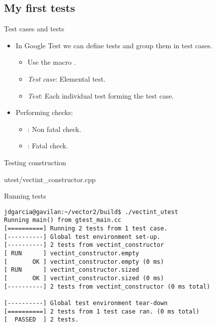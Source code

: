 \subsection{My first tests}

\begin{frame}[t]{Test cases and tests}
\begin{itemize}
  \item In Google Test we can define tests and group them in test cases.
    \begin{itemize}
      \item Use the macro .
      \item \emph{Test case}: Elemental test.
      \item \emph{Test}: Each individual test forming the test case.
    \end{itemize}

  \vfill
  \item Performing checks:
    \begin{itemize}
      \item {}: Non fatal check.
      \item {}: Fatal check.
    \end{itemize}
\end{itemize}
\end{frame}

\begin{frame}[t]{Testing construction}
\begin{block}{utest/vectint\_constructor.cpp}

\end{block}
\end{frame}

\begin{frame}[t,fragile]{Running tests}
\begin{lstlisting}[style=terminal]
jdgarcia@gavilan:~/vector2/build$ ./vectint_utest 
Running main() from gtest_main.cc
[==========] Running 2 tests from 1 test case.
[----------] Global test environment set-up.
[----------] 2 tests from vectint_constructor
[ RUN      ] vectint_constructor.empty
[       OK ] vectint_constructor.empty (0 ms)
[ RUN      ] vectint_constructor.sized
[       OK ] vectint_constructor.sized (0 ms)
[----------] 2 tests from vectint_constructor (0 ms total)

[----------] Global test environment tear-down
[==========] 2 tests from 1 test case ran. (0 ms total)
[  PASSED  ] 2 tests.
\end{lstlisting}
\end{frame}

